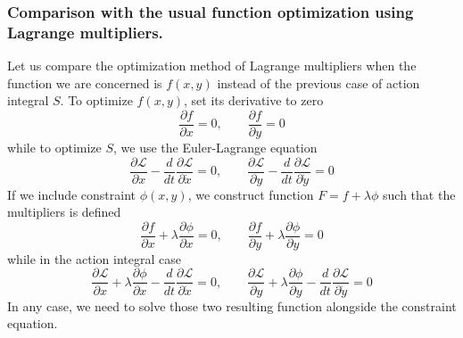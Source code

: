 \documentclass[../../../main.tex]{subfiles}
\begin{document}
\subsubsection*{Comparison with the usual function optimization using Lagrange multipliers.}
Let us compare the optimization method of Lagrange multipliers when the function we are concerned is $f(x,y)$ instead of the previous case of action integral $S$.
To optimize $f(x,y)$, set its derivative to zero
\begin{equation*}
	\frac{\partial f}{\partial x}=0,\qquad\frac{\partial f}{\partial y}=0
\end{equation*}
while to optimize $S$, we use the Euler-Lagrange equation
\begin{equation*}
	\frac{\partial \mathcal{L}}{\partial x}-\frac{d}{dt}\frac{\partial\mathcal{L}}{\partial\dot{x}}=0,\qquad\frac{\partial\mathcal{L}}{\partial y}-\frac{d}{dt}\frac{\partial \mathcal{L}}{\partial \dot{y}}=0
\end{equation*}
If we include constraint $\phi(x,y)$, we construct function $F=f+\lambda\phi$ such that the multipliers is defined
\begin{equation*}
	\frac{\partial f}{\partial x}+\lambda\frac{\partial \phi}{\partial x}=0,\qquad\frac{\partial f}{\partial y}+\lambda\frac{\partial \phi}{\partial y}=0
\end{equation*}
while in the action integral case
\begin{equation*}
	\frac{\partial \mathcal{L}}{\partial x}+\lambda\frac{\partial\phi}{\partial x}-\frac{d}{dt}\frac{\partial\mathcal{L}}{\partial\dot{x}}=0,
	\qquad\frac{\partial\mathcal{L}}{\partial y}+\lambda\frac{\partial\phi}{\partial y}-\frac{d}{dt}\frac{\partial \mathcal{L}}{\partial \dot{y}}=0
\end{equation*}
In any case, we need to solve those two resulting function alongside the constraint equation.
\end{document}
